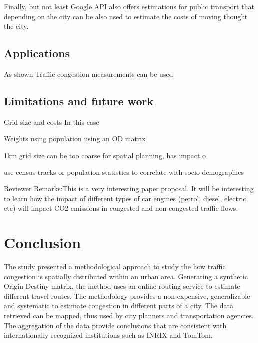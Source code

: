 \documentclass[a4paper]{jpconf}
\begin{document}
\indent Finally, but not least Google API also offers estimations for public transport that depending on the city can be also used to estimate the costs of moving thought the city. 



\subsection{Applications}
\indent As shown \cite{Lomax1997} Traffic congestion measurements can be used  


\subsection{Limitations and future work}
\indent Grid size and costs
In this case 


\indent Weights
using population
using an OD matrix

1km grid size can be too coarse for spatial planning, has impact o

\indent use census tracks or population statistics to correlate with socio-demographics


\indent Reviewer Remarks:This is a very interesting paper proposal. It will be interesting to learn how the impact of different types of car engines (petrol, diesel, electric, etc) will impact CO2 emissions in congested and non-congested traffic flows.

\section{Conclusion} %
\indent The study presented a methodological approach to study the how traffic congestion is spatially distributed within an urban area. Generating a synthetic Origin-Destiny matrix, the method uses an online routing service to estimate different travel routes. The methodology provides a non-expensive, generalizable and systematic to estimate congestion in different parts of a city. The data retrieved can be mapped, thus used by city planners and transportation agencies. The aggregation of the data provide conclusions that are consistent with internationally recognized institutions such as INRIX and TomTom. 


\printbibliography %
\end{document}
